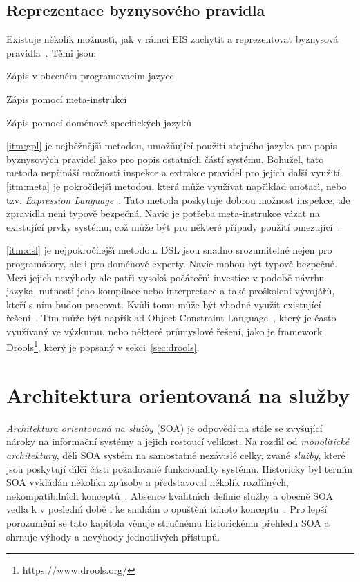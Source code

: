 \subsection{Reprezentace byznysového pravidla}

Existuje několik možnost\'{\i}, jak v rámci \gls{EIS} zachytit a reprezentovat byznysová
pravidla~\cite{cemus2015automated}. Těmi jsou:

\benum[label=\circledAlph]
    \item\label{itm:gpl} Zápis v obecném programovacím jazyce
    \item\label{itm:meta} Zápis pomocí meta-instrukcí
    \item\label{itm:dsl} Zápis pomocí doménově specifických jazyků
\eenum

\ref{itm:gpl} je nejběžnějš\'{\i} metodou, umožňující použití stejného jazyka pro popis byznysových pravidel jako
pro popis ostatních částí systému. Bohužel, tato metoda nepřináší možnosti inspekce a extrakce pravidel pro jejich další využití.
\ref{itm:meta} je pokročilejš\'{\i} metodou, která může využívat např\'{\i}klad anotac\'{\i}, nebo tzv. \textit{Expression
Language}~\cite{nemuraite2008representation}. Tato metoda poskytuje dobrou možnost inspekce, ale zpravidla nen\'{\i} typově bezpečná.
Navíc je potřeba meta-instrukce vázat na existující prvky systému, což může být pro některé případy použití omezující~\cite{cemus2015automated}.

\ref{itm:dsl} je nejpokročilejš\'{\i} metodou. \gls{DSL} jsou snadno srozumitelné nejen pro programátory, ale i pro doménové experty.
Navíc mohou b\'yt typově bezpečné. Mezi jejich nev\'yhody ale patř\'{\i} vysoká počátečn\'{\i} investice v podobě návrhu jazyka, nutnosti
jeho kompilace nebo interpretace a také proškolení vývojářů, kteří s ním budou pracovat. Kvůli tomu může být vhodné využít
existující řešení~\cite{cemus2015automated}. Tím může být například Object Constraint Language~\cite{warmer1998object},
který je často využívaný ve výzkumu, nebo některé průmyslové řešení, jako je framework Drools\footnote{https://www.drools.org/},
který je popsaný v sekci~\ref{sec:drools}.

\section{Architektura orientovaná na služby}\label{sec:soa}

\textit{Architektura orientovaná na služby} (\gls{SOA}) je odpovědí na stále se zvyšující
nároky na informační systémy a jejich rostoucí velikost. Na rozd\'{\i}l od \textit{monolitické architektury},
děl\'{\i} \gls{SOA} systém na samostatné nezávislé celky, zvané \textit{služby}, které jsou
poskytují d\'{\i}lč\'{\i} části požadované funkcionality systému.
Historicky byl term\'{\i}n \gls{SOA} vykládán několika způsoby a představoval
několik rozd\'{\i}ln\'ych, nekompatibiln\'{\i}ch konceptů~\cite{fowler2005serviceorientedambiguity}.
Absence kvalitn\'{\i}ch definic služby a obecně \gls{SOA} vedla k v posledn\'{\i} době i ke snahám
o opuštěn\'{\i} tohoto konceptu~\cite{cerny2017disambiguation}.
Pro lepší porozumění se tato kapitola věnuje stručnému historickému přehledu \gls{SOA}
a shrnuje výhody a nevýhody jednotlivých přístupů.

